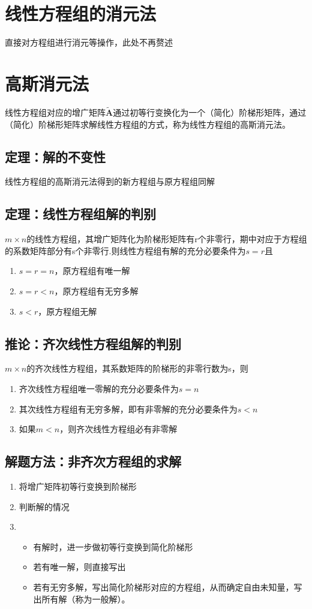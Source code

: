 \documentclass[a4paper]{ctexbook}
\begin{document}
\section{线性方程组的消元法} 直接对方程组进行消元等操作，此处不再赘述
\section{高斯消元法} 线性方程组对应的增广矩阵\(\mathbf {\tilde A}\)通过初等行变换化为一个（简化）阶梯形矩阵，通过（简化）阶梯形矩阵求解线性方程组的方式，称为线性方程组的高斯消元法。
\subsection{定理：解的不变性} 线性方程组的高斯消元法得到的新方程组与原方程组同解
\subsection{定理：线性方程组解的判别} \(m \times n\)的线性方程组，其增广矩阵化为阶梯形矩阵有r个非零行，期中对应于方程组的系数矩阵部分有s个非零行.则线性方程组有解的充分必要条件为\(s=r\)且
\begin{enumerate}
    \item \(s=r=n\)，原方程组有唯一解
    \item \(s=r<n\)，原方程组有无穷多解
    \item \(s<r\)，原方程组无解
\end{enumerate}
\subsection{推论：齐次线性方程组解的判别} \(m \times n\)的齐次线性方程组，其系数矩阵的阶梯形的非零行数为s，则
\begin{enumerate}
    \item 齐次线性方程组唯一零解的充分必要条件为\(s=n\)
    \item 其次线性方程组有无穷多解，即有非零解的充分必要条件为\(s<n\)
    \item 如果\(m<n\)，则齐次线性方程组必有非零解
\end{enumerate}
\subsection{解题方法：非齐次方程组的求解}
\begin{enumerate}
    \item 将增广矩阵初等行变换到阶梯形
    \item 判断解的情况
    \item {\begin{itemize}
        \item 有解时，进一步做初等行变换到简化阶梯形
        \item 若有唯一解，则直接写出
        \item 若有无穷多解，写出简化阶梯形对应的方程组，从而确定自由未知量，写出所有解（称为一般解）。
        \end{itemize}}
\end{enumerate}
\end{document}
